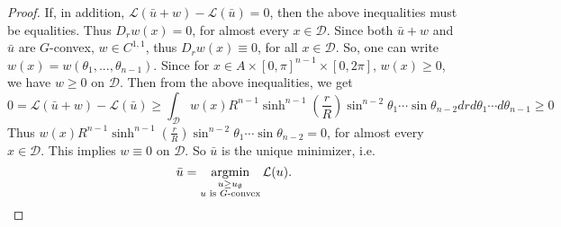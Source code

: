 \begin{proof}
	If, in addition,  $\mathcal{L}(\bar{u}+w)-\mathcal{L}(\bar{u})=0$, then the above inequalities must be equalities. Thus $D_rw(x)=0$, for almost every $x \in \mathcal{D}$. Since both $\bar{u}+w$ and $\bar{u}$ are $G$-convex, $w \in C^{1,1}$, thus $D_r w(x)\equiv 0$, for all $x\in \mathcal{D}$. So, one can write $w(x)= w(\theta_1, ..., \theta_{n-1})$. Since for $x\in A\times [0,\pi]^{n-1}\times[0,2\pi]$, $w(x)\ge 0$, we have $w\ge 0$ on $\mathcal{D}$. Then from the above inequalities, we get 
	\begin{equation*}
	0=\mathcal{L}(\bar{u}+w)-\mathcal{L}(\bar{u})\ge \int_{\mathcal{D}} w(x)R^{n-1}\sinh^{n-1}(\frac{r}{R})\sin^{n-2}\theta_1\cdots \sin\theta_{n-2} dr d\theta_1 \cdots d\theta_{n-1}\ge 0
	\end{equation*} 
	Thus $ w(x)R^{n-1}\sinh^{n-1}(\frac{r}{R})\sin^{n-2}\theta_1\cdots \sin\theta_{n-2} =0$, for almost every $ x \in \mathcal{D}$. This implies $w \equiv 0 $ on $\mathcal{D}$. So $\bar{u}$ is the unique minimizer, i.e. 
	\begin{equation*}
	\bar{u}= \argmin\limits_{\substack{u\ge u_{\emptyset} \\ u \text{ is $G$-convex}}} \mathcal{L}(u).
	\end{equation*}




\end{proof}



